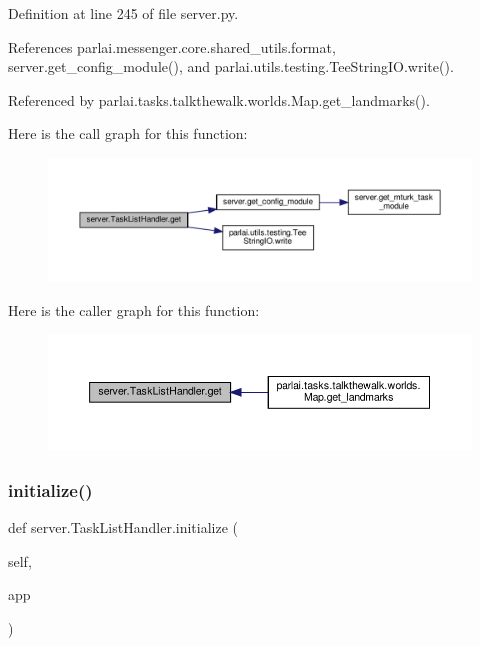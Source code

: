 Definition at line 245 of file server.\+py.



References parlai.\+messenger.\+core.\+shared\+\_\+utils.\+format, server.\+get\+\_\+config\+\_\+module(), and parlai.\+utils.\+testing.\+Tee\+String\+I\+O.\+write().



Referenced by parlai.\+tasks.\+talkthewalk.\+worlds.\+Map.\+get\+\_\+landmarks().

Here is the call graph for this function\+:
\nopagebreak
\begin{figure}[H]
\begin{center}
\leavevmode
\includegraphics[width=350pt]{classserver_1_1TaskListHandler_a137d4866bf8522230742085684e903c5_cgraph}
\end{center}
\end{figure}
Here is the caller graph for this function\+:
\nopagebreak
\begin{figure}[H]
\begin{center}
\leavevmode
\includegraphics[width=350pt]{classserver_1_1TaskListHandler_a137d4866bf8522230742085684e903c5_icgraph}
\end{center}
\end{figure}
\mbox{\label{classserver_1_1TaskListHandler_a9d75887c9b129d1acb943fb72252496b}} 
\subsubsection{\texorpdfstring{initialize()}{initialize()}}
{\footnotesize\ttfamily def server.\+Task\+List\+Handler.\+initialize (\begin{DoxyParamCaption}\item[{}]{self,  }\item[{}]{app }\end{DoxyParamCaption})}




